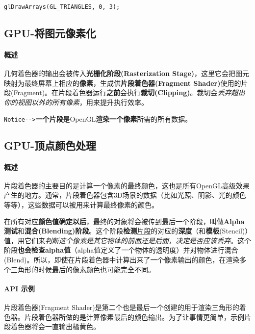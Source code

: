 \documentclass[UTF8,a4paper,12pt]{ctexbook}
\begin{document}
				\begin{lstlisting}
glDrawArrays(GL_TRIANGLES, 0, 3);				
				\end{lstlisting}
				
		
		\subsection{GPU-将图元像素化}
			\paragraph{概述}		
				几何着色器的输出会被传入\textbf{光栅化阶段(Rasterization Stage)}，这里它会把图元映射为最终屏幕上相应的\textbf{像素}，生成供\textbf{片段着色器(Fragment Shader)}使用的片段(Fragment)。在片段着色器运行\textbf{之前}会执行\textbf{裁切(Clipping)}。裁切会\textit{丢弃超出你的视图以外的所有像素}，用来提升执行效率。
				
				\verb|Notice-->|\textbf{一个片段}是OpenGL\textbf{渲染一个像素}所需的所有数据。
			
			
		\subsection{GPU-顶点颜色处理}
			\paragraph{概述}		
				片段着色器的主要目的是计算一个像素的最终颜色，这也是所有OpenGL高级效果产生的地方。通常，片段着色器包含3D场景的数据（比如光照、阴影、光的颜色等等），这些数据可以被用来计算最终像素的颜色。
				
				在所有对应\textbf{颜色值确定以后}，最终的对象将会被传到最后一个阶段，叫做\textbf{Alpha测试}和\textbf{混合(Blending)阶段}。这个阶段\textbf{检测}\underline{片段}的对应的\textbf{深度}（和\textbf{模板}(Stencil)）值，用它们来\textit{判断这个像素是其它物体的前面还是后面，决定是否应该丢弃}。这个阶段\textbf{也会检查alpha值}（alpha值定义了一个物体的透明度）并对物体进行混合(Blend)。所以，即使在片段着色器中计算出来了一个像素输出的颜色，在渲染多个三角形的时候最后的像素颜色也可能完全不同。
				
			\paragraph{API 示例}
				片段着色器(Fragment Shader)是第二个也是最后一个创建的用于渲染三角形的着色器。片段着色器所做的是计算像素最后的颜色输出。为了让事情更简单，示例片段着色器将会一直输出橘黄色。
				
\end{document}

